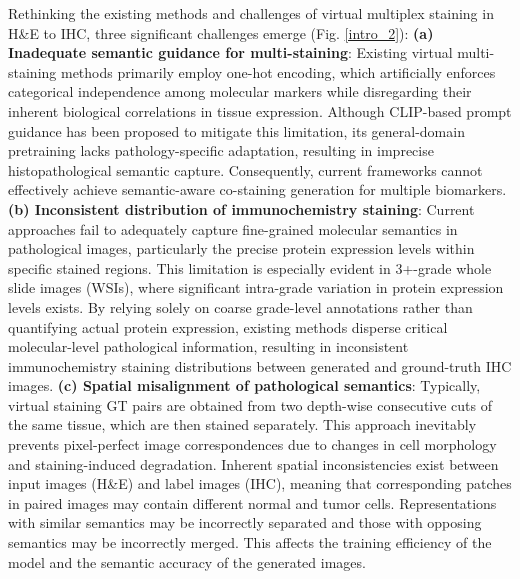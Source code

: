 \documentclass[journal,twoside,web]{ieeecolor}
\begin{document}
Rethinking the existing methods and challenges of virtual multiplex staining in H\&E to IHC, three significant challenges emerge (Fig. \ref{intro_2}): 
\textbf{(a) Inadequate semantic guidance for multi-staining}: Existing virtual multi-staining methods primarily employ one-hot encoding, which artificially enforces categorical independence among molecular markers while disregarding their inherent biological correlations in tissue expression. Although CLIP-based prompt guidance has been proposed to mitigate this limitation, its general-domain pretraining lacks pathology-specific adaptation, resulting in imprecise histopathological semantic capture. Consequently, current frameworks cannot effectively achieve semantic-aware co-staining generation for multiple biomarkers.
\textbf{(b) Inconsistent distribution of immunochemistry staining}: Current approaches fail to adequately capture fine-grained molecular semantics in pathological images, particularly the precise protein expression levels within specific stained regions. This limitation is especially evident in 3+-grade whole slide images (WSIs), where significant intra-grade variation in protein expression levels exists. By relying solely on coarse grade-level annotations rather than quantifying actual protein expression, existing methods disperse critical molecular-level pathological information, resulting in inconsistent immunochemistry staining distributions between generated and ground-truth IHC images. 
\textbf{(c) Spatial misalignment of pathological semantics}: Typically, virtual staining GT pairs are obtained from two depth-wise consecutive cuts of the same tissue, which are then stained separately. This approach inevitably prevents pixel-perfect image correspondences due to changes in cell morphology and staining-induced degradation. Inherent spatial inconsistencies exist between input images (H\&E) and label images (IHC), meaning that corresponding patches in paired images may contain different normal and tumor cells. Representations with similar semantics may be incorrectly separated and those with opposing semantics may be incorrectly merged. This affects the training efficiency of the model and the semantic accuracy of the generated images.
\end{document}
